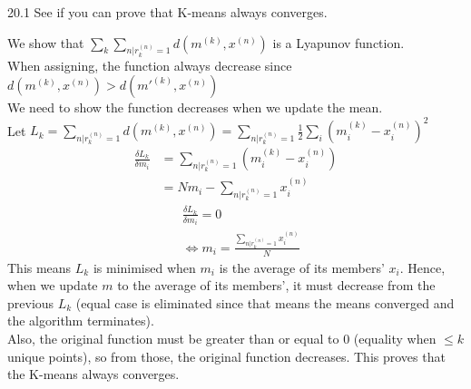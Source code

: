 \documentclass[12pt, a4paper]{article}
\begin{document}
\begin{prob}{20.1}
See if you can prove that K-means always converges.
\end{prob}
\begin{sol}
We show that $\sum_{k}\sum_{{n|r_k^(n) = 1}}d(m^{(k)}, x^{(n)})$ is a Lyapunov function. \\
When assigning, the function always decrease since $d(m^{(k)}, x^{(n)}) > d(m'^{(k)}, x^{(n)})$ \\
We need to show the function decreases when we update the mean. \\
Let $L_k = \sum_{{n|r_k^{(n)} = 1}}d(m^{(k)}, x^{(n)}) = \sum_{{n|r_k^(n) = 1}}\frac{1}{2}\sum_{i}(m_i^{(k)} - x_i^{(n)})^2$ \\
\begin{align*}
    \frac{\delta L_k}{\delta m_i} &= \sum_{{n|r_k^{(n)} = 1}}(m_i^{(k)} - x_i^{(n)}) \\
    &= Nm_i - \sum_{{n|r_k^{(n)} = 1}}x_i^{(n)}
\end{align*}
\begin{align*}
    &\frac{\delta L_k}{\delta m_i} = 0 \\
    &\iff m_i = \frac{\sum_{{n|r_k^{(n)} = 1}}x_i^{(n)}}{N}
\end{align*}
This means $L_k$ is minimised when $m_i$ is the average of its members' $x_i$.
Hence, when we update $m$ to the average of its members', it must decrease from the previous $L_k$ (equal case is eliminated since that means the means converged and the algorithm terminates). \\
Also, the original function must be greater than or equal to 0 (equality when $\leq k$ unique points), so from those, the original function decreases.
This proves that the K-means always converges.
\end{sol}
\bigskip
\end{document}

